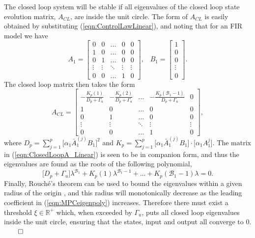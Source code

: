 \begin{proof*}
The closed loop system will be stable if all eigenvalues of the closed loop state evolution matrix, $A_{CL}$, are inside the unit circle. The form of $A_{CL}$ is easily obtained by substituting (\ref{eqn:ControlLawLinear}), and noting that for an FIR model we have
\begin{equation}
A_1 = \begin{bmatrix} 0 & 0 & \hdots & 0 & 0 \\ 1 & 0 & \hdots & 0 & 0 \\ 0 & 1 & \hdots & 0 & 0 \\ \vdots & \vdots & \ddots & \vdots & \vdots \\ 0 & 0 & \hdots & 1 & 0 \end{bmatrix}, \; \; \; B_1 = \begin{bmatrix} 1 \\ 0 \\ 0 \\ \vdots \\ 0 \end{bmatrix}.
\end{equation}
The closed loop matrix then takes the form
\begin{equation}
A_{CL} = \begin{bmatrix} -\frac{K_p(1)}{D_p + \Gamma_u} & -\frac{K_p(2)}{D_p + \Gamma_u} & \hdots & -\frac{K_p(\mathcal{B}_1-1)}{D_p + \Gamma_u} & 0 \\ 1 & 0 & \hdots & 0 & 0 \\ 0 & 1 & \hdots & 0 & 0 \\ \vdots & \vdots & \ddots & \vdots & \vdots \\ 0 & 0 & \hdots & 1 & 0 \end{bmatrix},
\label{eqn:ClosedLoopA_Linear}
\end{equation} 
where $D_p = \sum_{j=1}^{p} \big[ \alpha_1 \bar{A}_1^{(j)} B_1 \big]^2$ and $K_p = \sum_{j=1}^{p} \big[ \alpha_1 \bar{A}_1^{(j)} B_1 \big] \cdot \big[ \alpha_1 A_1^j \big]$. The matrix in (\ref{eqn:ClosedLoopA_Linear}) is seen to be in companion form, and thus the eigenvalues are found as the roots of the following polynomial,
\begin{equation}
\big[ D_p + \Gamma_u \big] \lambda^{\mathcal{B}_1} + K_p(1) \lambda^{\mathcal{B}_1-1} + \hdots + K_p(\mathcal{B}_1-1) \lambda = 0.
\label{eqn:MPCeigenpoly}
\end{equation}
Finally, Rouch{\'e}'s theorem can be used to bound the eigenvalues within a given radius of the origin \cite{Conway1978}, and this radius will monotonically decrease as the leading coefficient in (\ref{eqn:MPCeigenpoly}) increases. Therefore there must exist a threshold $\xi \in \mathbb{R}^+$ which, when exceeded by $\Gamma_u$, puts all closed loop eigenvalues inside the unit circle, ensuring that the states, input and output all converge to 0.  \hfill $\qed$
\end{proof*}

